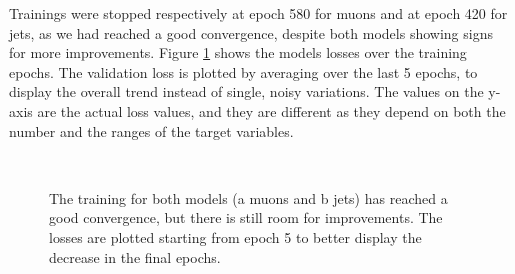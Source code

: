 Trainings were stopped respectively at epoch 580 for muons and at epoch 420 for jets, as we had reached a good convergence, despite both models showing signs for more improvements. Figure \ref{fig:losses} shows the models losses over the training epochs. The validation loss is plotted by averaging over the last 5 epochs, to display the overall trend instead of single, noisy variations. The values on the y-axis are the actual loss values, and they are different as they depend on both the number and the ranges of the target variables.


\begin{figure}
    \myfloatalign
     \\
    \caption[Models losses]{The training for both models (a muons and b jets) has reached a good convergence, but there is still room for improvements. The losses are plotted starting from epoch 5 to better display the decrease in the final epochs.}\label{fig:losses}
    
\end{figure}

